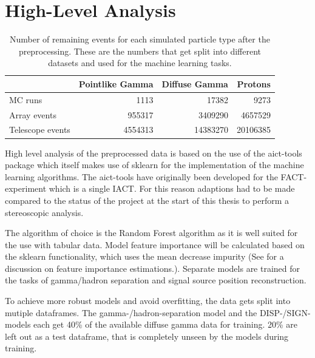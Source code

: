 \section{High-Level Analysis}

\begin{table}
    \caption{Number of remaining events for each simulated particle type after the
    preprocessing. These are the numbers that get split into different datasets 
    and used for the machine learning tasks.}
    \begin{center}
        \begin{tabular}{l r r r}
            & Pointlike Gamma & Diffuse Gamma & Protons \\
            \hline
            MC runs & \num{1113} & \num{17382} &  \num{9273} \\ 
            Array events & \num{955317} & \num{3409290} & \num{4657529} \\
            Telescope events & \num{4554313} & \num{14383270} & \num{20106385} \\
        \end{tabular}
    \end{center}
    \label{tab:events_after_prep}
\end{table}

High level analysis of the preprocessed data is based on the use of
the aict-tools \cite{aict-tools} package which itself makes use of
sklearn \cite{sklearn_api} for the implementation of the machine learning algorithms.
The aict-tools have originally been developed for the FACT-experiment
which is a single IACT. 
For this reason
adaptions had to be made compared to the status of the project at the start 
of this thesis to perform a stereoscopic analysis.

The algorithm of choice is the Random Forest algorithm
as it is well suited for the use with tabular data.
Model feature importance will be calculated
based on the sklearn functionality, which
uses the mean decrease impurity (See \cite{hastie2017springer} for a discussion on
feature importance estimations.).
Separate models are trained for the tasks of gamma/hadron
separation and signal source position
reconstruction.

To achieve more robust models and avoid overfitting, the data gets split into mutiple dataframes.
The gamma-/hadron-separation model and the DISP-/SIGN-models each get 
40\% of the available diffuse gamma data for training. 20\% are left out
as a test dataframe, that is completely unseen by the models during training.

